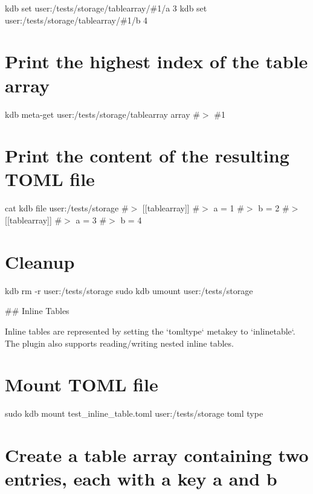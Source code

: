 kdb set \textquotesingle{}user\+:/tests/storage/tablearray/\#1/a\textquotesingle{} \textquotesingle{}3\textquotesingle{} kdb set \textquotesingle{}user\+:/tests/storage/tablearray/\#1/b\textquotesingle{} \textquotesingle{}4\textquotesingle{}\hypertarget{autotoc_md635_autotoc_md708}{}\section{Print the highest index of the table array}\label{autotoc_md635_autotoc_md708}
kdb meta-\/get \textquotesingle{}user\+:/tests/storage/tablearray\textquotesingle{} \textquotesingle{}array\textquotesingle{} \#$>$ \#1\hypertarget{autotoc_md635_autotoc_md709}{}\section{Print the content of the resulting T\+O\+M\+L file}\label{autotoc_md635_autotoc_md709}
cat {\ttfamily kdb file user\+:/tests/storage} \#$>$ \mbox{[}\mbox{[}tablearray\mbox{]}\mbox{]} \#$>$ a = 1 \#$>$ b = 2 \#$>$ \mbox{[}\mbox{[}tablearray\mbox{]}\mbox{]} \#$>$ a = 3 \#$>$ b = 4\hypertarget{autotoc_md635_autotoc_md710}{}\section{Cleanup}\label{autotoc_md635_autotoc_md710}
kdb rm -\/r user\+:/tests/storage sudo kdb umount user\+:/tests/storage 
\begin{DoxyCode}
## Inline Tables

Inline tables are represented by setting the `tomltype` metakey to `inlinetable`. The plugin also supports
       reading/writing nested inline tables.
\end{DoxyCode}
 \hypertarget{autotoc_md635_autotoc_md711}{}\section{Mount T\+O\+M\+L file}\label{autotoc_md635_autotoc_md711}
sudo kdb mount test\+\_\+inline\+\_\+table.\+toml user\+:/tests/storage toml type\hypertarget{autotoc_md635_autotoc_md712}{}\section{Create a table array containing two entries, each with a key \textquotesingle{}a\textquotesingle{} and \textquotesingle{}b\textquotesingle{}}\label{autotoc_md635_autotoc_md712}
